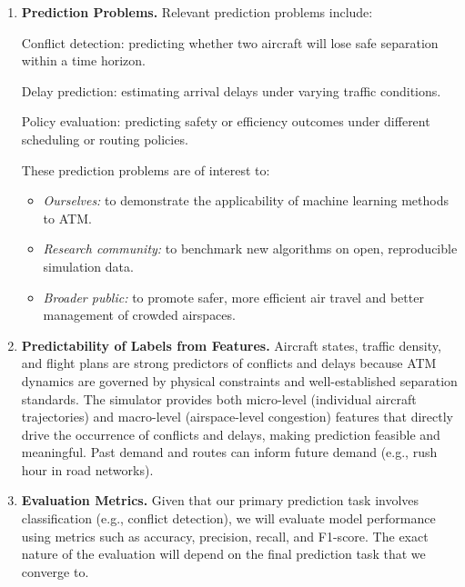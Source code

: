 \documentclass[a4paper]{article}
\begin{document}
\begin{enumerate}
\item \textbf{Prediction Problems.}
Relevant prediction problems include:

Conflict detection: predicting whether two aircraft will lose safe separation within a time horizon.

Delay prediction: estimating arrival delays under varying traffic conditions.

Policy evaluation: predicting safety or efficiency outcomes under different scheduling or routing policies.

These prediction problems are of interest to:
\begin{itemize}
    \item \emph{Ourselves:} to demonstrate the applicability of machine learning methods to ATM.
    \item \emph{Research community:} to benchmark new algorithms on open, reproducible simulation data.
    \item \emph{Broader public:} to promote safer, more efficient air travel and better management of crowded airspaces.
\end{itemize}


\item \textbf{Predictability of Labels from Features.} Aircraft states, traffic density, and flight plans are strong predictors of conflicts and delays because ATM dynamics are governed by physical constraints and well-established separation standards. The simulator provides both micro-level (individual aircraft trajectories) and macro-level (airspace-level congestion) features that directly drive the occurrence of conflicts and delays, making prediction feasible and meaningful. Past demand and routes can inform future demand (e.g., rush hour in road networks).


\item \textbf{Evaluation Metrics.}  
Given that our primary prediction task involves classification (e.g., conflict detection), we will evaluate model performance using metrics such as accuracy, precision, recall, and F1-score. The exact nature of the evaluation will depend on the final prediction task that we converge to.



\end{enumerate}
\end{document}
